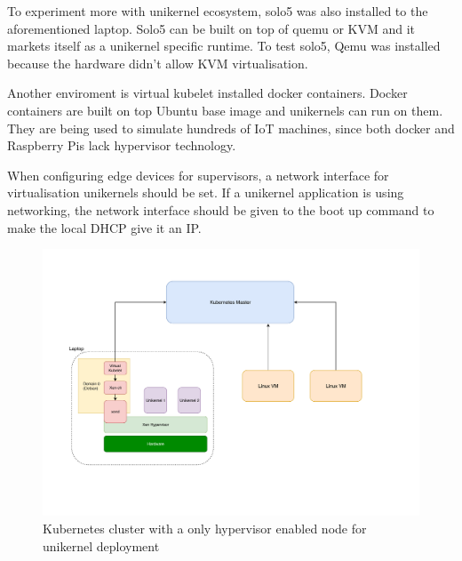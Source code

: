 To experiment more with unikernel ecosystem, solo5 was also installed to the aforementioned laptop. Solo5 can be built on top of quemu or KVM and it markets itself as a unikernel specific runtime. To test solo5, Qemu was installed because the hardware didn't allow KVM virtualisation.

Another enviroment is virtual kubelet installed docker containers. Docker containers are built on top Ubuntu base image and unikernels can run on them. They are being used to simulate hundreds of IoT machines, since both docker and Raspberry Pis lack hypervisor technology.

When configuring edge devices for supervisors, a network interface for virtualisation unikernels should be set. If a unikernel application is using networking, the network interface should be given to the boot up command to make the local DHCP give it an IP.


\begin{figure}[htpb]
  
    \centering
    \includegraphics[width=1.2\textwidth]{figures/arch_new.pdf}
    \caption{ Kubernetes cluster with a only hypervisor enabled node for unikernel deployment} \label{fig:hypervisor}
  \end{figure}
